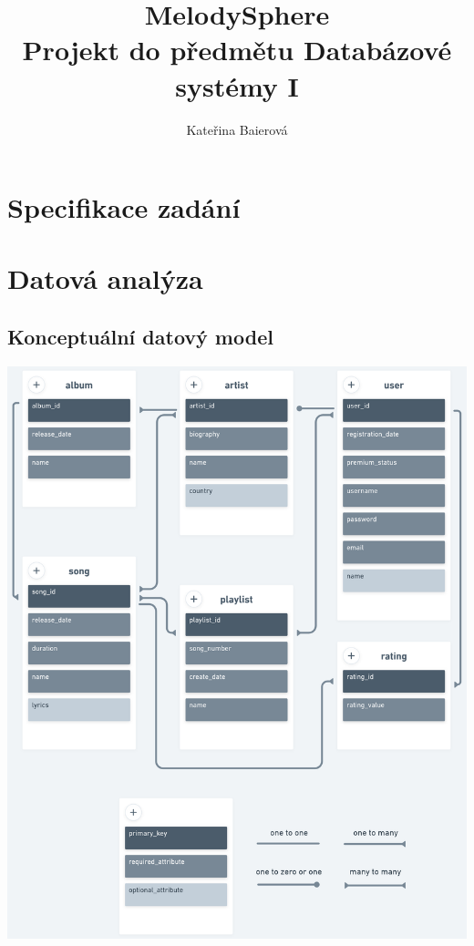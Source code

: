 \documentclass[czech,12pt,a4paper,titlepage]{article}
\title{%
    \textbf {MelodySphere} \\
    \bigskip
    \large Projekt do předmětu Databázové systémy I}
\author{Kateřina Baierová}
\date{}
\begin{document}
    \graphicspath{ {./img/} }

    \begin{titlepage}
        \maketitle
        \thispagestyle{empty}
    \end{titlepage}

    \tableofcontents

    \clearpage


    \section{Specifikace zadání}\label{sec:specifikace-zadani}
    


    \section{Datová analýza}\label{sec:datova-analyza}
    \subsection*{Konceptuální datový model}
    \bigskip
    \bigskip
    \includegraphics[width=0.9 \textwidth, center]{konceptualni_datovy_model}
\end{document}
